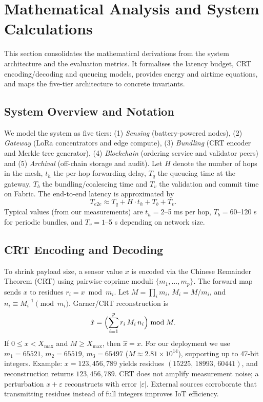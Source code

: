 \documentclass[12pt,onecolumn]{IEEEtran} %
\begin{document}
\section{Mathematical Analysis and System Calculations}
\label{sec:math-analysis}
This section consolidates the mathematical derivations from the system architecture and the evaluation metrics. It formalises the latency budget, CRT encoding/decoding and queueing models, provides energy and airtime equations, and maps the five-tier architecture to concrete invariants.

\subsection{System Overview and Notation}
We model the system as five tiers: (1) \emph{Sensing} (battery-powered nodes),
(2) \emph{Gateway} (LoRa concentrators and edge compute),
(3) \emph{Bundling} (CRT encoder and Merkle tree generator),
(4) \emph{Blockchain} (ordering service and validator peers) and
(5) \emph{Archival} (off-chain storage and audit).  Let \(H\) denote the number of hops in the mesh, \(t_h\) the per-hop forwarding delay, \(T_q\) the queueing time at the gateway, \(T_b\) the bundling/coalescing time and \(T_v\) the validation and commit time on Fabric.
The end-to-end latency is approximated by
\begin{equation}
T_{e2e} \approx T_q + H \cdot t_h + T_b + T_v.
\end{equation}
Typical values (from our measurements) are \(t_h=2\)–5 ms per hop, \(T_b=60\)–120 s for periodic bundles, and \(T_v=1\)–5 s depending on network size.

\subsection{CRT Encoding and Decoding}
To shrink payload size, a sensor value \(x\) is encoded via the Chinese Remainder Theorem (CRT) using pairwise-coprime moduli \(\{m_1,\ldots,m_p\}\). The forward map sends \(x\) to residues \(r_i = x \bmod m_i\). Let \(M=\prod_i m_i\), \(M_i=M/m_i\), and \(n_i \equiv M_i^{-1}\pmod{m_i}\). Garner/CRT reconstruction is
\begin{equation}
\hat{x} = \Bigl(\sum_{i=1}^p r_i\,M_i\,n_i\Bigr)\bmod M.
\end{equation}
If \(0\le x < X_{\max}\) and \(M\ge X_{\max}\), then \(\hat{x}=x\). For our deployment we use \(m_1=65521\), \(m_2=65519\), \(m_3=65497\) (\(M\approx2.81\times10^{14}\)), supporting up to 47-bit integers. Example: \(x=123{,}456{,}789\) yields residues \((15225,\,18993,\,60441)\), and reconstruction returns \(123{,}456{,}789\). CRT does not amplify measurement noise; a perturbation \(x+\varepsilon\) reconstructs with error \(|\varepsilon|\). External sources corroborate that transmitting residues instead of full integers improves IoT efficiency.
\end{document}
